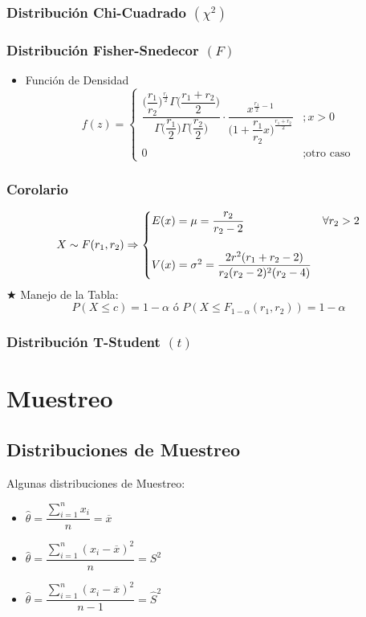 \documentclass[10pt,letterpaper]{article}
\begin{document}
\subsubsection{Distribución Chi-Cuadrado $(\chi^2)$}
\subsubsection{Distribución Fisher-Snedecor $(F)$}
\begin{itemize}
\item Función de Densidad \\
$$
f(z)=
\begin{cases}
\dfrac{\Big(\dfrac{r_1}{r_2}\Big)^{\frac{r_1}{2}}\Gamma\Big(\dfrac{r_1+r_2}{2}\Big) }{\Gamma\Big(\dfrac{r_1}{2}\Big)\Gamma\Big(\dfrac{r_2}{2}\Big)}\cdot \dfrac{x^{\frac{r_1}{2}-1}}{\Big(1+\dfrac{r_1}{r_2}x\Big)^{\frac{r_1+r_2}{2}}} &;x>0 \\
0 &;\text{otro caso}
\end{cases}
$$
\end{itemize}
\subsubsection*{Corolario}
$$
X\sim F(r_1,r_2)\Rightarrow
\begin{cases}
E(x)=\mu=\dfrac{r_2}{r_2-2} & \forall r_2>2 \\\vspace{0.05cm} \\
V(x)=\sigma^2=\dfrac{2r^2(r_1+r_2-2)}{r_2(r_2-2)^2(r_2-4)}
\end{cases}
$$
\noindent$\bigstar$ Manejo de la Tabla:
$$P(X\leq c) = 1-\alpha \text{ ó } P(X\leq F_{1-\alpha}(r_1,r_2))=1-\alpha$$
\subsubsection{Distribución T-Student $(t)$}

\section{Muestreo}
\subsection{Distribuciones de Muestreo}
Algunas distribuciones de Muestreo:
\begin{multicols}{3}
\begin{itemize}
\item $\widehat{\theta}=\dfrac{\displaystyle\sum_{i=1}^{n} x_i}{n}=\overline{x}$
\end{itemize}
\columnbreak
\begin{itemize}
\item $\widehat{\theta}=\dfrac{\displaystyle\sum_{i=1}^{n} (x_i-\overline{x})^2}{n}=S^2$
\end{itemize}
\columnbreak
\begin{itemize}
\item $\widehat{\theta}=\dfrac{\displaystyle\sum_{i=1}^{n} (x_i-\overline{x})^2}{n-1}=\widehat{S}^2$
\end{itemize}
\end{multicols}
\end{document}
